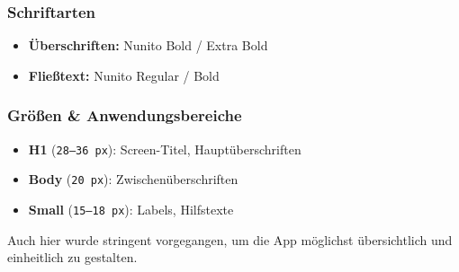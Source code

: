 \subsubsection{Schriftarten}
\begin{itemize}
	\item \textbf{Überschriften:} Nunito Bold / Extra Bold
	\item \textbf{Fließtext:} Nunito Regular / Bold
\end{itemize}

\subsubsection{Größen \& Anwendungsbereiche}
\begin{itemize}
	\item \textbf{H1} (\texttt{28--36\,px}): Screen-Titel, Hauptüberschriften
	\item \textbf{Body} (\texttt{20\,px}): Zwischenüberschriften
	\item \textbf{Small} (\texttt{15--18\,px}): Labels, Hilfstexte
\end{itemize}
Auch hier wurde stringent vorgegangen, um die App möglichst übersichtlich und einheitlich zu gestalten.

\newpage
